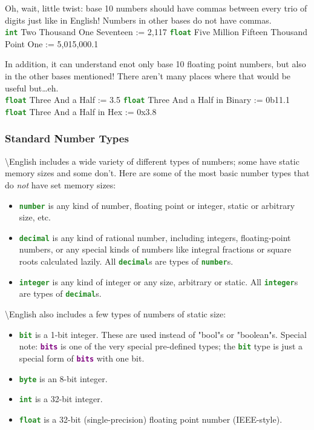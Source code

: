 \documentclass{article}
\newcommand{\name}{\textbackslash{}English}				%
\newcommand{\sssecl}[1]{\subsubsection{#1}\label{sssec:#1}}
\newcommand{\type}[1]{\texttt{\textcolor{ForestGreen}{\textbf{#1}}}}
\newcommand{\keyop}[1]{\texttt{\textcolor{Purple}{\textbf{#1}}}}
\newenvironment{code}[0]
{\ttfamily{}				%
\setlength\parindent{0cm}	%
~\\}
{\setlength\parindent{1cm}
~\\}
\begin{document}
\indent Oh, wait, little twist: base 10 numbers should have commas between every trio of digits just like in English! Numbers in other bases do not have commas.
\begin{code}
\type{int} Two Thousand One Seventeen := 2,117
\type{float} Five Million Fifteen Thousand Point One := 5,015,000.1
\end{code}

\indent In addition, it can understand enot only base 10 floating point numbers, but also in the other bases mentioned! There aren't many places where that would be useful but\ldots{}eh.
\begin{code}
\type{float} Three And a Half := 3.5
\type{float} Three And a Half in Binary := 0b11.1
\type{float} Three And a Half in Hex := 0x3.8
\end{code}

\sssecl{Standard Number Types}
\indent \name{} includes a wide variety of different types of numbers; some have static memory sizes and some don't. Here are some of the most basic number types that do \emph{not} have set memory sizes:
\begin{itemize}
	\item \type{number} is any kind of number, floating point or integer, static or arbitrary size, etc.
	\item \type{decimal} is any kind of rational number, including integers, floating-point numbers, or any special kinds of numbers like integral fractions or square roots calculated lazily. All \type{decimal}s are types of \type{number}s.
	\item \type{integer} is any kind of integer or any size, arbitrary or static. All \type{integer}s are types of \type{decimal}s.
\end{itemize}

\indent \name{} also includes a few types of numbers of static size:
\begin{itemize}
	\item \type{bit} is a 1-bit integer. These are used instead of "bool"s or "boolean"s. Special note: \keyop{bits} is one of the very special pre-defined types; the \type{bit} type is just a special form of \keyop{bits} with one bit.
	\item \type{byte} is an 8-bit integer.
	\item \type{int} is a 32-bit integer.
	\item \type{float} is a 32-bit (single-precision) floating point number (IEEE-style).
\end{itemize}
\end{document}
